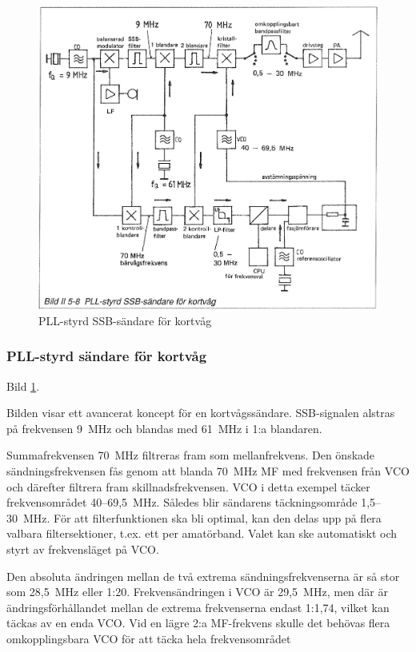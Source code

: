 \begin{figure}
  \includegraphics[width=\textwidth]{images/bild_2_5-08}
  \caption{PLL-styrd SSB-sändare för kortvåg}
  \label{fig:bildII5-8}
\end{figure}

\subsubsection{PLL-styrd sändare för kortvåg}

Bild \ref{fig:bildII5-8}.

Bilden visar ett avancerat koncept för en kortvågssändare.
SSB-signalen alstras på frekvensen 9~MHz och blandas med 61~MHz i 1:a
blandaren.

Summafrekvensen 70~MHz filtreras fram som mellanfrekvens. Den önskade
sändningsfrekvensen fås genom att blanda 70~MHz MF med frekvensen från
VCO och därefter filtrera fram skillnadsfrekvensen.  VCO i detta
exempel täcker frekvensområdet 40--69,5~MHz. Således blir sändarens
täckningsområde 1,5--30~MHz. För att filterfunktionen ska bli
optimal, kan den delas upp på flera valbara filtersektioner, t.ex. ett
per amatörband. Valet kan ske automatiskt och styrt av frekvensläget
på VCO.

Den absoluta ändringen mellan de två extrema sändningsfrekvenserna är
så stor som 28,5~MHz eller 1:20. Frekvensändringen i VCO är 29,5~MHz,
men där är ändringsförhållandet mellan de extrema frekvenserna endast
1:1,74, vilket kan täckas av en enda VCO. Vid en lägre 2:a MF-frekvens
skulle det behövas flera omkopplingsbara VCO för att täcka hela
frekvensområdet

